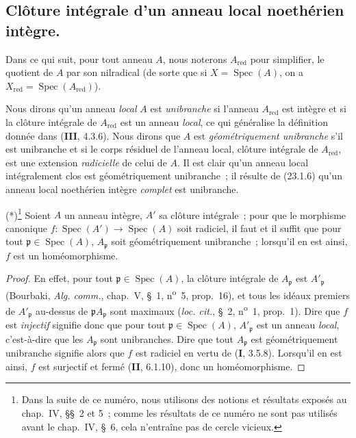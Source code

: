 \subsection{Clôture intégrale d'un anneau local noethérien intègre.}
\label{subsection:0.23.2-fr}

\begin{env}[23.2.1]
\label{0.23.2.1-fr}
Dans ce qui suit, pour tout anneau $A$, nous noterons $A_{\mathrm{red}}$ pour
simplifier, le quotient de $A$ par son nilradical (de sorte que si
$X=\operatorname{Spec}(A)$, on a
$X_{\mathrm{red}}=\operatorname{Spec}(A_{\mathrm{red}})$).

Nous dirons qu'un anneau \emph{local} $A$ est \emph{unibranche} si l'anneau
$A_{\mathrm{red}}$ est intègre et si la clôture intégrale de
$A_{\mathrm{red}}$ est un anneau \emph{local}, ce qui généralise la définition
donnée dans (\textbf{III}, 4.3.6). Nous dirons que $A$ est \emph{géométriquement
unibranche} s'il est unibranche et si le corps résiduel de l'anneau local,
clôture intégrale de $A_{\mathrm{red}}$, est une extension \emph{radicielle}
de celui de $A$. Il est clair qu'un anneau local intégralement clos est
géométriquement unibranche~; il résulte de (23.1.6) qu'un anneau local
noethérien intègre \emph{complet} est unibranche.
\end{env}

\begin{lemma}[23.2.2]
\label{0.23.2.2-fr}
\textnormal{(*)}\footnote{Dans la suite de ce numéro, nous utilisons des
notions et résultats exposés au chap.~IV, §§~2 et 5~; comme les résultats de
ce numéro ne sont pas utilisés avant le chap.~IV, §~6, cela n'entraîne pas de
cercle vicieux.} Soient $A$ un anneau intègre, $A'$ sa clôture intégrale~; pour
que le morphisme canonique
$f:\operatorname{Spec}(A')\to\operatorname{Spec}(A)$ soit radiciel, il faut et
il suffit que pour tout $\mathfrak p\in\operatorname{Spec}(A)$,
$A_{\mathfrak p}$ soit géométriquement unibranche~; lorsqu'il en est ainsi,
$f$ est un homéomorphisme.
\end{lemma}

\begin{proof}
En effet, pour tout $\mathfrak p\in\operatorname{Spec}(A)$, la clôture
intégrale de $A_{\mathfrak p}$ est $A'_{\mathfrak p}$ (Bourbaki,
\emph{Alg. comm.}, chap.~V, §~1, n\textsuperscript{o}~5, prop.~16), et tous
les idéaux premiers de $A'_{\mathfrak p}$ au-dessus de
$\mathfrak pA_{\mathfrak p}$ sont maximaux (\emph{loc. cit.}, §~2,
n\textsuperscript{o}~1, prop.~1). Dire que $f$ est \emph{injectif} signifie donc que
pour tout $\mathfrak p\in\operatorname{Spec}(A)$, $A'_{\mathfrak p}$ est un
anneau \emph{local}, c'est-à-dire que les $A_{\mathfrak p}$ sont
unibranches. Dire que tout $A_{\mathfrak p}$ est géométriquement unibranche
signifie alors que $f$ est radiciel en vertu de (\textbf{I}, 3.5.8). Lorsqu'il en est
ainsi, $f$ est surjectif et fermé (\textbf{II}, 6.1.10), donc un homéomorphisme.
\end{proof}

